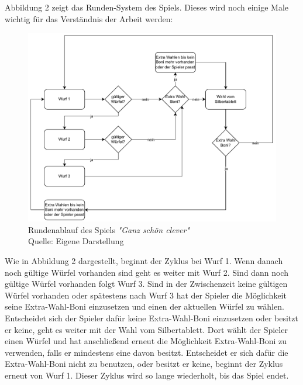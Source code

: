 Abbildung 2 zeigt das Runden-System des Spiels. Dieses wird noch einige Male wichtig für das Verständnis der Arbeit werden:
	\nopagebreak
\begin{figure}[H]
	\includegraphics[width=1\textwidth]{Bilder/Rundenablauf.drawio} 
	\caption[Rundenablauf des Spiels \textit{"Ganz schön clever"}]{Rundenablauf des Spiels \textit{"Ganz schön clever"}\\ Quelle: Eigene Darstellung}
\end{figure}

Wie in Abbildung 2 dargestellt, beginnt der Zyklus bei Wurf 1. Wenn danach noch gültige Würfel vorhanden sind geht es weiter mit Wurf 2. Sind dann noch gültige Würfel vorhanden folgt Wurf 3. Sind in der Zwischenzeit keine gültigen Würfel vorhanden oder spätestens nach Wurf 3 hat der Spieler die Möglichkeit seine Extra-Wahl-Boni einzusetzen und einen der aktuellen Würfel zu wählen. Entscheidet sich der Spieler dafür keine Extra-Wahl-Boni einzusetzen oder besitzt er keine, geht es weiter mit der Wahl vom Silbertablett. Dort wählt der Spieler einen Würfel und hat anschließend erneut die Möglichkeit Extra-Wahl-Boni zu verwenden, falls er mindestens eine davon besitzt. Entscheidet er sich dafür die Extra-Wahl-Boni nicht zu benutzen, oder besitzt er keine, beginnt der Zyklus erneut von Wurf 1. Dieser Zyklus wird so lange wiederholt, bis das Spiel endet.\\

